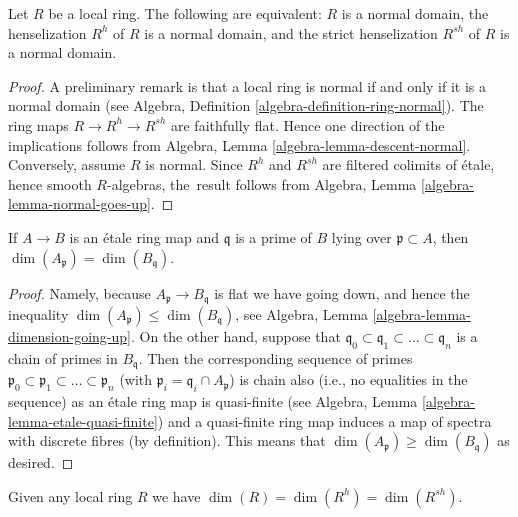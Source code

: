 \begin{lemma}
\label{lemma-henselization-normal}
Let $R$ be a local ring.
The following are equivalent: $R$ is a normal domain,
the henselization $R^h$ of $R$ is a normal domain, and
the strict henselization $R^{sh}$ of $R$ is a normal domain.
\end{lemma}

\begin{proof}
A preliminary remark is that a local ring is normal if and only if it is
a normal domain (see
Algebra, Definition \ref{algebra-definition-ring-normal}).
The ring maps $R \to R^h \to R^{sh}$ are faithfully flat.
Hence one direction of the implications follows from
Algebra, Lemma \ref{algebra-lemma-descent-normal}.
Conversely, assume $R$ is normal. Since $R^h$ and $R^{sh}$
are filtered colimits of \'etale, hence smooth $R$-algebras, the\
result follows from
Algebra, Lemma \ref{algebra-lemma-normal-goes-up}.
\end{proof}

\begin{lemma}
\label{lemma-dimension-etale-extension}
If $A \to B$ is an \'etale ring map and $\mathfrak q$ is a prime of
$B$ lying over $\mathfrak p \subset A$, then
$\dim(A_{\mathfrak p}) = \dim(B_{\mathfrak q})$.
\end{lemma}

\begin{proof}
Namely, because $A_{\mathfrak p} \to B_{\mathfrak q}$ is flat we have
going down, and hence the inequality
$\dim(A_{\mathfrak p}) \leq \dim(B_{\mathfrak q})$, see
Algebra, Lemma \ref{algebra-lemma-dimension-going-up}.
On the other hand, suppose that
$\mathfrak q_0 \subset \mathfrak q_1 \subset \ldots \subset \mathfrak q_n$
is a chain of primes in $B_{\mathfrak q}$. Then the corresponding
sequence of primes
$\mathfrak p_0 \subset \mathfrak p_1 \subset \ldots \subset \mathfrak p_n$
(with $\mathfrak p_i = \mathfrak q_i \cap A_{\mathfrak p}$) is chain
also (i.e., no equalities in the sequence) as an
\'etale ring map is quasi-finite (see
Algebra, Lemma \ref{algebra-lemma-etale-quasi-finite})
and a quasi-finite ring map induces a map of spectra with
discrete fibres (by definition).
This means that $\dim(A_{\mathfrak p}) \geq \dim(B_{\mathfrak q})$ as
desired.
\end{proof}

\begin{lemma}
\label{lemma-henselization-dimension}
Given any local ring $R$ we have $\dim(R) = \dim(R^h) = \dim(R^{sh})$.
\end{lemma}

